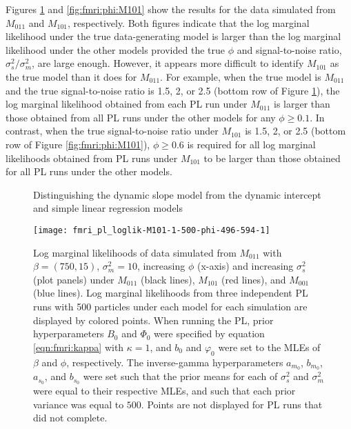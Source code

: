 Figures \ref{fig:fmri:phi:M011} and \ref{fig:fmri:phi:M101} show the results for the data simulated from $M_{011}$ and $M_{101}$, respectively. Both figures indicate that the log marginal likelihood under the true data-generating model is larger than the log marginal likelihood under the other models provided the true $\phi$ and signal-to-noise ratio, $\sigma^2_s/\sigma^2_m$, are large enough. However, it appears more difficult to identify $M_{101}$ as the true model than it does for $M_{011}$. For example, when the true model is $M_{011}$ and the true signal-to-noise ratio is 1.5, 2, or 2.5 (bottom row of Figure \ref{fig:fmri:phi:M011}), the log marginal likelihood obtained from each PL run under $M_{011}$ is larger than those obtained from all PL runs under the other models for any $\phi \ge 0.1$. In contrast, when the true signal-to-noise ratio under $M_{101}$ is 1.5, 2, or 2.5 (bottom row of Figure \ref{fig:fmri:phi:M101}), $\phi \ge 0.6$ is required for all log marginal likelihoods obtained from PL runs under $M_{101}$ to be larger than those obtained for all PL runs under the other models.

\begin{figure}
\ssp
\centering
\caption{Distinguishing the dynamic slope model from the dynamic intercept and simple linear regression models} \label{fig:fmri:phi:M011}
\texttt{[image: fmri\_pl\_loglik-M101-1-500-phi-496-594-1]}
\caption*{Log marginal likelihoods of data simulated from $M_{011}$ with $\beta=(750,15)$, $\sigma^2_m = 10$, increasing $\phi$ (x-axis) and increasing $\sigma^2_s$ (plot panels) under $M_{011}$ (black lines), $M_{101}$ (red lines), and $M_{001}$ (blue lines). Log marginal likelihoods from three independent PL runs with 500 particles under each model for each simulation are displayed by colored points. When running the PL, prior hyperparameters $B_0$ and $\Phi_0$ were specified by equation \eqref{eqn:fmri:kappa} with $\kappa = 1$, and $b_0$ and $\varphi_0$ were set to the MLEs of $\beta$ and $\phi$, respectively. The inverse-gamma hyperparameters $a_{m_0}$, $b_{m_0}$, $a_{s_0}$, and $b_{s_0}$ were set such that the prior means for each of $\sigma^2_s$ and $\sigma^2_m$ were equal to their respective MLEs, and such that each prior variance was equal to $500$. Points are not displayed for PL runs that did not complete.}
\end{figure}


